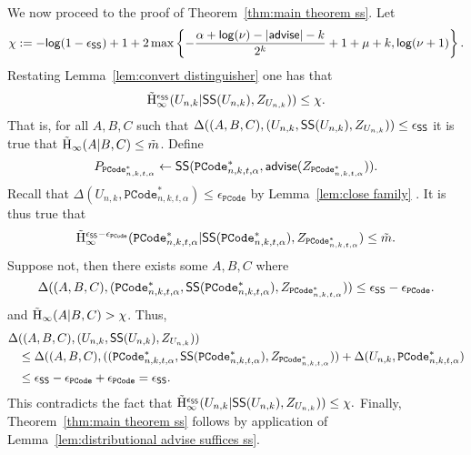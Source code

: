 \noindent
We now proceed to the proof of Theorem~\ref{thm:main theorem ss}.   Let \[\chi:= -\mathsf{log}\!\left(1-\epsilon_{\mathsf{SS}}\right) +1 + 2\max\left\{-\frac{\alpha+\mathsf{log}\!\left(\nu\right)-|{\mathsf{advise}}|-k}{2^k}+1+\mu+k, \mathsf{log}\!\left(\nu+1\right)\right\}.\]  Restating Lemma~\ref{lem:convert distinguisher} one has that 
\[
\tilde{\mathrm{H}}_\infty^{\epsilon_{\mathsf{SS}}}(U_{n,k} | {\mathsf{SS}}(U_{n,k}), Z_{U_{n,k}})) \le \chi.
\]
That is, for all $A, B, C$ such that $\Delta((A, B, C), (U_{n,k},{\mathsf{SS}}(U_{n,k}), Z_{U_{n,k}}))\le \epsilon_{{\mathsf{SS}}}$ it is true that $\tilde{\mathrm{H}}_\infty(A|B, C) \le \tilde{m}$.  Define \[P_{\mathtt{PCode}_{n, k, t, \alpha}^{*}}\leftarrow {\ensuremath{\mathsf{SS}}}(\mathtt{PCode}_{n, k, t, \alpha}^{*}, {\mathsf{advise}}(Z_{\mathtt{PCode}_{n, k, t, \alpha}^{*}})).\]
Recall that $\Delta(U_{n,k}, \mathtt{PCode}_{n, k, t, \alpha}^{*}) \le \epsilon_{\mathtt{PCode}}$ by Lemma~\ref{lem:close family} .  
It is thus true that 
\[
\tilde{\mathrm{H}}_\infty^{\epsilon_{{\mathsf{SS}}}-\epsilon_{\mathtt{PCode}}}(\mathtt{PCode}_{n, k, t, \alpha}^{*} | {\mathsf{SS}}(\mathtt{PCode}_{n, k, t, \alpha}^{*}), Z_{\mathtt{PCode}_{n, k, t, \alpha}^{*}})\le \tilde{m}.
\]
Suppose not, then there exists some $A, B, C$ where 
\[
\Delta((A, B, C), (\mathtt{PCode}_{n, k, t, \alpha}^{*} , {\mathsf{SS}}(\mathtt{PCode}_{n, k, t, \alpha}^{*}), Z_{\mathtt{PCode}_{n, k, t, \alpha}^{*}}))\le \epsilon_{{\mathsf{SS}}}-\epsilon_{\mathtt{PCode}}.
\]
and $\tilde{\mathrm{H}}_\infty(A|B, C)>\chi$.
Thus, 
\begin{align*}
\Delta&((A, B, C), (U_{n,k},{\mathsf{SS}}(U_{n,k}), Z_{U_{n,k}}))\\&\le \Delta((A, B, C), ((\mathtt{PCode}_{n, k, t, \alpha}^{*} , {\mathsf{SS}}(\mathtt{PCode}_{n, k, t, \alpha}^{*}), Z_{\mathtt{PCode}_{n, k, t, \alpha}^{*}}))+\Delta(U_{n,k}, \mathtt{PCode}_{n, k, t, \alpha}^{*})\\
&\le \epsilon_{{\mathsf{SS}}}-\epsilon_{\mathtt{PCode}}+ \epsilon_{\mathtt{PCode}} = \epsilon_{{\mathsf{SS}}}.
\end{align*}
This contradicts the fact that $\tilde{\mathrm{H}}_\infty^{\epsilon_{\mathsf{SS}}}(U_{n,k} | {\mathsf{SS}}(U_{n,k}), Z_{U_{n,k}})) \le \chi.$
Finally, Theorem~\ref{thm:main theorem ss} follows by application of Lemma~\ref{lem:distributional advise suffices ss}.






